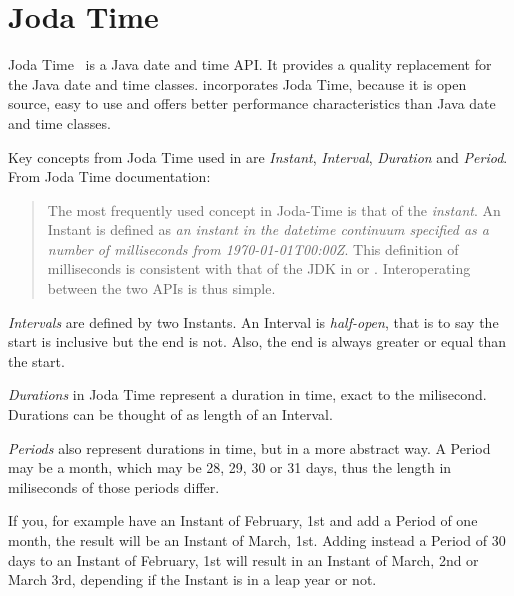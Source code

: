 \section{Joda Time}
Joda Time~\cite{jodatime} is a Java date and time API.
It provides a quality replacement for the Java date and time classes.
\salespoint incorporates Joda Time, because it is open source, easy to use and offers better performance characteristics than Java date and time classes.

Key concepts from Joda Time used in \salespoint{} are \textit{Instant}, \textit{Interval}, \textit{Duration} and \textit{Period}.
From Joda Time documentation:
\begin{quote}
The most frequently used concept in Joda-Time is that of the \textit{instant}.
An Instant is defined as \textit{an instant in the datetime continuum specified as a number of milliseconds from 1970-01-01T00:00Z}.
This definition of milliseconds is consistent with that of the JDK in  or .
Interoperating between the two APIs is thus simple.
\end{quote}

\textit{Intervals} are defined by two Instants.
An Interval is \textit{half-open}, that is to say the start is inclusive but the end is not.
Also, the end is always greater or equal than the start.

\textit{Durations} in Joda Time represent a duration in time, exact to the milisecond.
Durations can be thought of as length of an Interval.

\textit{Periods} also represent durations in time, but in a more abstract way.
A Period may be a month, which may be 28, 29, 30 or 31 days, thus the length in miliseconds of those periods differ.

If you, for example have an Instant of February, 1st and add a Period of one month, the result will be an Instant of March, 1st.
Adding instead a Period of 30 days to an Instant of February, 1st will result in an Instant of March, 2nd or March 3rd, depending if the Instant is in a leap year or not.
